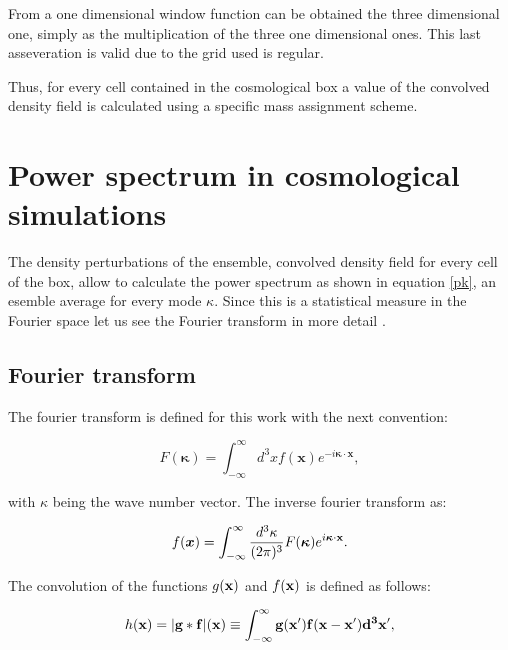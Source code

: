 From a one dimensional window function can be obtained the three dimensional one, simply as
the multiplication of the three one dimensional ones. This last asseveration is valid due to 
the grid used is regular. 

Thus, for every cell contained in the cosmological box a value of the convolved density 
field is calculated using a specific mass assignment scheme. 

\section{ Power spectrum in cosmological simulations }


The density perturbations of the ensemble, convolved density field for every cell 
of the box, allow to calculate the power spectrum as shown in equation \ref{pk},
an esemble average for every mode $\kappa$. Since this is a statistical measure in
the Fourier space let us see the Fourier transform in more detail \cite{Mont}.

\subsection{Fourier transform}

The fourier transform is defined for this work with the next convention:

\begin{equation}
F(\boldsymbol{\kappa}) = \int_{-\infty}^{\infty} d^3 x f(\textbf{x})e^{-i \boldsymbol{\kappa}\cdot\boldsymbol{x}	},
\label{FT}
\end{equation}

with $\kappa$ being the wave number vector. The inverse fourier transform as:

\begin{equation}
f( \boldsymbol{x}) = \int_{-\infty}^{\infty} \frac{d^3 \kappa}{(2\pi)^3}  F(\boldsymbol{\kappa})e^{i \boldsymbol{\kappa}\cdot\bf{x}	}.
\label{IFT}
\end{equation}

The convolution of the functions $g(\bf{x})$ and $f(\bf{x})$ is defined as follows:

\[h(\bf{x}) = |g*f|(\bf{x})\equiv \int_{-\infty}^{\infty} g(\bf{x}')f(\bf{x} - \bf{x}') d^3 x' , \]

